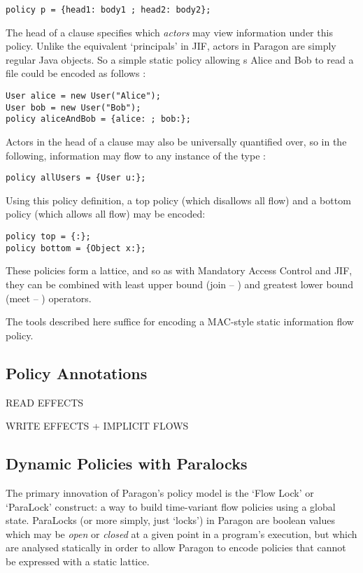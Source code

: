 \begin{verbatim}
policy p = {head1: body1 ; head2: body2};
\end{verbatim}

The head of a clause specifies which \textit{actors} may view information under this policy. Unlike the equivalent `principals' in JIF, actors in Paragon are simply regular Java objects. So a simple static policy allowing s Alice and Bob to read a file could be encoded as follows \cite{broberg2013paragon}:

\begin{verbatim}
User alice = new User("Alice");
User bob = new User("Bob");
policy aliceAndBob = {alice: ; bob:};
\end{verbatim}

Actors in the head of a clause may also be universally quantified over, so in the following, information may flow to any instance of the type :

\begin{verbatim}
policy allUsers = {User u:};
\end{verbatim}

Using this policy definition, a top policy (which disallows all flow) and a bottom policy (which allows all flow) may be encoded:

\begin{verbatim}
policy top = {:};
policy bottom = {Object x:};
\end{verbatim}

These policies form a lattice, and so as with Mandatory Access Control and JIF, they can be combined with least upper bound (join -- \mono{+}) and greatest lower bound (meet -- \mono{*}) operators.

The tools described here suffice for encoding a MAC-style static information flow policy.

\subsection{Policy Annotations}

READ EFFECTS

WRITE EFFECTS + IMPLICIT FLOWS

\subsection{Dynamic Policies with Paralocks}

The primary innovation of Paragon's policy model is the `Flow Lock' or `ParaLock' construct: a way to build time-variant flow policies using a global state. ParaLocks (or more simply, just `locks') in Paragon are boolean values which may be \textit{open} or \textit{closed} at a given point in a program's execution, but which are analysed statically in order to allow Paragon to encode policies that cannot be expressed with a static lattice.

